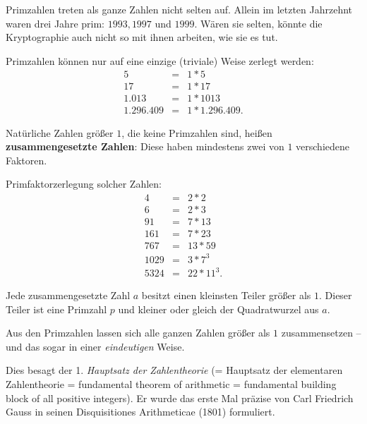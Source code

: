 \begin{refsegment}
Primzahlen treten als ganze Zahlen nicht selten auf. Allein im letzten
Jahrzehnt waren drei Jahre prim: $1993, 1997$ und $1999$. Wären sie selten,
könnte die Kryptographie auch nicht so mit ihnen arbeiten, wie sie es tut.

Primzahlen können nur auf eine einzige (\glqq triviale\grqq) Weise zerlegt werden:
\begin{eqnarray*}
5 & = & 1 * 5 \nonumber\\
17 & =  & 1 * 17 \nonumber\\
1.013 &  = & 1 * 1013 \nonumber\\
1.296.409 & = & 1 * 1.296.409. \nonumber
\end{eqnarray*}

\begin{definition}\label{def-zth-composite}
Natürliche Zahlen größer $1$, die keine Primzahlen sind, heißen
\textbf{zusammengesetzte Zahlen}: Diese haben mindestens zwei von $1$ verschiedene
Faktoren.
\end{definition}


\begin{example}{ Primfaktorzerlegung solcher Zahlen:}
\begin{eqnarray*}
4 & = & 2*2  \nonumber\\
6 & = & 2*3  \nonumber\\
91 & = & 7*13  \nonumber\\
161 & = & 7*23  \nonumber\\
767 & = & 13*59  \nonumber\\
1029 & = & 3 * 7^3  \nonumber\\
5324 & = & 22 * 11^3.  \nonumber
\end{eqnarray*}

\begin{satz}\label{thm-zth-cnum}
Jede zusammengesetzte Zahl $a$ besitzt einen kleinsten Teiler größer
als $1$. Dieser Teiler ist eine Primzahl $p$ und kleiner oder gleich der Quadratwurzel
aus $a$.
\end{satz}
\end{example}
Aus den Primzahlen lassen sich alle ganzen Zahlen größer als $1$
zusammensetzen -- und das sogar in einer {\em eindeutigen} Weise.

Dies besagt  der 1. {\em Hauptsatz der Zahlentheorie} (= Hauptsatz der elementaren
Zahlentheorie = fundamental theorem of arithmetic = fundamental building
block of all positive integers). Er wurde das erste Mal präzise von Carl
Friedrich Gauss in seinen Disquisitiones Arithmeticae (1801) formuliert.
  


\end{refsegment}
